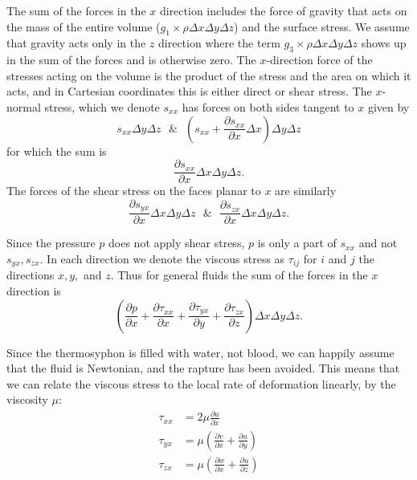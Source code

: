 \documentclass[12pt]{report}
\begin{document}
The sum of the forces in the $x$ direction includes the force of gravity that acts on the mass of the entire volume ($g_1 \times \rho \Delta x\Delta y \Delta z$) and the surface stress.
We assume that gravity acts only in the $z$ direction where the term $g_3 \times \rho \Delta x \Delta y \Delta z$ shows up in the sum of the forces and is otherwise zero.
The $x$-direction force of the stresses acting on the volume is the product of the stress and the area on which it acts, and in Cartesian coordinates this is either direct or shear stress.
The $x$-normal stress, which we denote $s_{xx}$ has forces on both sides tangent to $x$ given by
\begin{equation*} s_{xx} \Delta y \Delta z ~~~\& ~~~ \left ( s_{xx} + \frac{\partial s_{xx} }{\partial x} \Delta x \right ) \Delta y \Delta z \end{equation*}
for which the sum is
\begin{equation*} \frac{\partial s_{xx} }{\partial x} \Delta x \Delta y \Delta z .\end{equation*}
The forces of the shear stress on the faces planar to $x$ are similarly
\begin{equation*} \frac{\partial s_{yx} }{\partial x} \Delta x \Delta y \Delta z ~~~\&~~~\frac{\partial s_{zx} }{\partial x} \Delta x \Delta y \Delta z .\end{equation*} 

Since the pressure $p$ does not apply shear stress, $p$ is only a part of $s_{xx}$ and not $s_{yx},s_{zx}$.
In each direction we denote the viscous stress as $\tau _{ij}$ for $i$ and $j$ the directions $x,y,$ and $z$.
Thus for general fluids the sum of the forces in the $x$ direction is
\begin{equation*} \left ( \frac{\partial p }{\partial x} + \frac{\partial \tau _{xx}}{\partial x} + \frac{\partial \tau _{yx}}{\partial y} + \frac{\partial \tau _{zx}}{\partial z} \right ) \Delta x \Delta y \Delta z . \end{equation*}

Since the thermosyphon is filled with water, not blood, we can happily assume that the fluid is Newtonian, and the rapture has been avoided.
This means that we can relate the viscous stress to the local rate of deformation linearly, by the viscosity $\mu$:
\begin{align*} \tau _{xx} &= 2 \mu \frac{\partial u}{\partial x} \\
\tau _{yx} &= \mu \left ( \frac{\partial v}{\partial x} + \frac{\partial u}{\partial y} \right )\\
\tau _{zx} &= \mu \left ( \frac{\partial w}{\partial x} + \frac{\partial u}{\partial z} \right )\end{align*}
\end{document}
